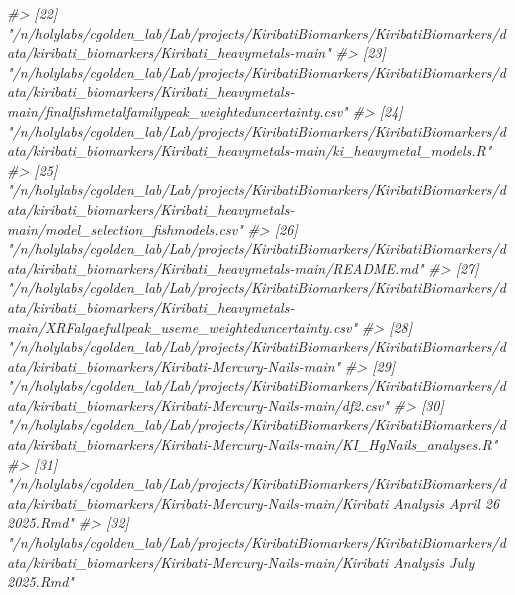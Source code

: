 \documentclass[]{article}
\newenvironment{Shaded}{\begin{snugshade}}{\end{snugshade}}
\newcommand{\CommentTok}[1]{\textcolor[rgb]{0.56,0.35,0.01}{\textit{#1}}}
\begin{document}
\begin{Shaded}
\begin{Highlighting}[]
\CommentTok{#> [22] "/n/holylabs/cgolden_lab/Lab/projects/KiribatiBiomarkers/KiribatiBiomarkers/data/kiribati_biomarkers/Kiribati_heavymetals-main"                                                                                                 }
\CommentTok{#> [23] "/n/holylabs/cgolden_lab/Lab/projects/KiribatiBiomarkers/KiribatiBiomarkers/data/kiribati_biomarkers/Kiribati_heavymetals-main/finalfishmetalfamilypeak_weighteduncertainty.csv"                                                }
\CommentTok{#> [24] "/n/holylabs/cgolden_lab/Lab/projects/KiribatiBiomarkers/KiribatiBiomarkers/data/kiribati_biomarkers/Kiribati_heavymetals-main/ki_heavymetal_models.R"                                                                          }
\CommentTok{#> [25] "/n/holylabs/cgolden_lab/Lab/projects/KiribatiBiomarkers/KiribatiBiomarkers/data/kiribati_biomarkers/Kiribati_heavymetals-main/model_selection_fishmodels.csv"                                                                  }
\CommentTok{#> [26] "/n/holylabs/cgolden_lab/Lab/projects/KiribatiBiomarkers/KiribatiBiomarkers/data/kiribati_biomarkers/Kiribati_heavymetals-main/README.md"                                                                                       }
\CommentTok{#> [27] "/n/holylabs/cgolden_lab/Lab/projects/KiribatiBiomarkers/KiribatiBiomarkers/data/kiribati_biomarkers/Kiribati_heavymetals-main/XRFalgaefullpeak_useme_weighteduncertainty.csv"                                                  }
\CommentTok{#> [28] "/n/holylabs/cgolden_lab/Lab/projects/KiribatiBiomarkers/KiribatiBiomarkers/data/kiribati_biomarkers/Kiribati-Mercury-Nails-main"                                                                                               }
\CommentTok{#> [29] "/n/holylabs/cgolden_lab/Lab/projects/KiribatiBiomarkers/KiribatiBiomarkers/data/kiribati_biomarkers/Kiribati-Mercury-Nails-main/df2.csv"                                                                                       }
\CommentTok{#> [30] "/n/holylabs/cgolden_lab/Lab/projects/KiribatiBiomarkers/KiribatiBiomarkers/data/kiribati_biomarkers/Kiribati-Mercury-Nails-main/KI_HgNails_analyses.R"                                                                         }
\CommentTok{#> [31] "/n/holylabs/cgolden_lab/Lab/projects/KiribatiBiomarkers/KiribatiBiomarkers/data/kiribati_biomarkers/Kiribati-Mercury-Nails-main/Kiribati Analysis April 26 2025.Rmd"                                                           }
\CommentTok{#> [32] "/n/holylabs/cgolden_lab/Lab/projects/KiribatiBiomarkers/KiribatiBiomarkers/data/kiribati_biomarkers/Kiribati-Mercury-Nails-main/Kiribati Analysis July 2025.Rmd"                                                               }

\end{Highlighting}
\end{Shaded}
\end{document}
